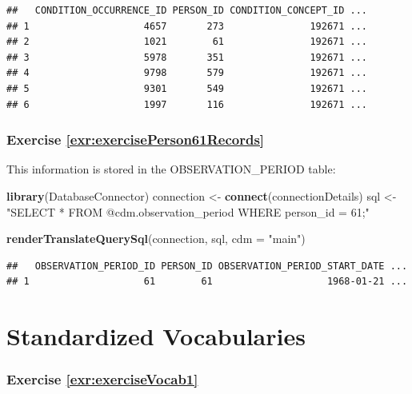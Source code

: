 \documentclass[11pt]{book}
\newenvironment{Shaded}{\begin{snugshade}}{\end{snugshade}}
\newcommand{\KeywordTok}[1]{\textcolor[rgb]{0.13,0.29,0.53}{\textbf{#1}}}
\newcommand{\DataTypeTok}[1]{\textcolor[rgb]{0.13,0.29,0.53}{#1}}
\newcommand{\StringTok}[1]{\textcolor[rgb]{0.31,0.60,0.02}{#1}}
\newcommand{\NormalTok}[1]{#1}
\theoremstyle{definition}
\theoremstyle{definition}
\theoremstyle{definition}
\theoremstyle{remark}
\begin{document}
\begin{verbatim}
##   CONDITION_OCCURRENCE_ID PERSON_ID CONDITION_CONCEPT_ID ...
## 1                    4657       273               192671 ...
## 2                    1021        61               192671 ...
## 3                    5978       351               192671 ...
## 4                    9798       579               192671 ...
## 5                    9301       549               192671 ...
## 6                    1997       116               192671 ...
\end{verbatim}

\subsubsection*{Exercise
\ref{exr:exercisePerson61Records}}\label{exercise-refexrexerciseperson61records}

This information is stored in the OBSERVATION\_PERIOD table:

\begin{Shaded}
\begin{Highlighting}[]
\KeywordTok{library}\NormalTok{(DatabaseConnector)}
\NormalTok{connection <-}\StringTok{ }\KeywordTok{connect}\NormalTok{(connectionDetails)}
\NormalTok{sql <-}\StringTok{ "SELECT *}
\StringTok{FROM @cdm.observation_period}
\StringTok{WHERE person_id = 61;"}

\KeywordTok{renderTranslateQuerySql}\NormalTok{(connection, sql, }\DataTypeTok{cdm =} \StringTok{"main"}\NormalTok{)}
\end{Highlighting}
\end{Shaded}

\begin{verbatim}
##   OBSERVATION_PERIOD_ID PERSON_ID OBSERVATION_PERIOD_START_DATE ...
## 1                    61        61                    1968-01-21 ...
\end{verbatim}

\section{Standardized Vocabularies}\label{Vocabanswers}

\subsubsection*{Exercise
\ref{exr:exerciseVocab1}}\label{exercise-refexrexercisevocab1}
\end{document}

